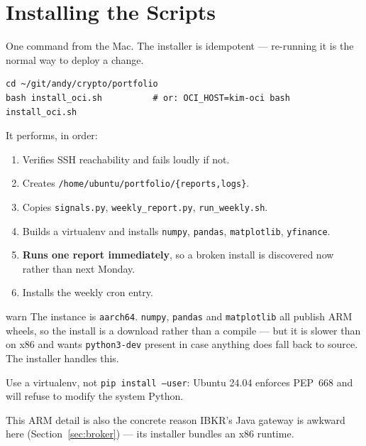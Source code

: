 \documentclass[11pt,a4paper]{article}
\begin{document}
\section{Installing the Scripts}

One command from the Mac. The installer is idempotent --- re-running it
is the normal way to deploy a change.

\begin{codebox}
\begin{lstlisting}[style=shell]
cd ~/git/andy/crypto/portfolio
bash install_oci.sh          # or: OCI_HOST=kim-oci bash install_oci.sh
\end{lstlisting}
\end{codebox}

\noindent It performs, in order:

\begin{enumerate}[leftmargin=2em]
    \item Verifies SSH reachability and fails loudly if not.
    \item Creates \texttt{/home/ubuntu/portfolio/\{reports,logs\}}.
    \item Copies \texttt{signals.py}, \texttt{weekly\_report.py},
          \texttt{run\_weekly.sh}.
    \item Builds a virtualenv and installs \texttt{numpy}, 
          \texttt{pandas}, \texttt{matplotlib}, \texttt{yfinance}.
    \item \textbf{Runs one report immediately}, so a broken install is
          discovered now rather than next Monday.
    \item Installs the weekly cron entry.
\end{enumerate}

\begin{resultbox}{warn}
The instance is \texttt{aarch64}. \texttt{numpy}, \texttt{pandas} and
\texttt{matplotlib} all publish ARM wheels, so the install is a
download rather than a compile --- but it is slower than on x86 and
wants \texttt{python3-dev} present in case anything does fall back to
source. The installer handles this.

Use a virtualenv, not \texttt{pip install --user}: Ubuntu 24.04
enforces PEP~668 and will refuse to modify the system Python.

This ARM detail is also the concrete reason IBKR's Java gateway is
awkward here (Section~\ref{sec:broker}) --- its installer bundles an
x86 runtime.
\end{resultbox}
\end{document}
